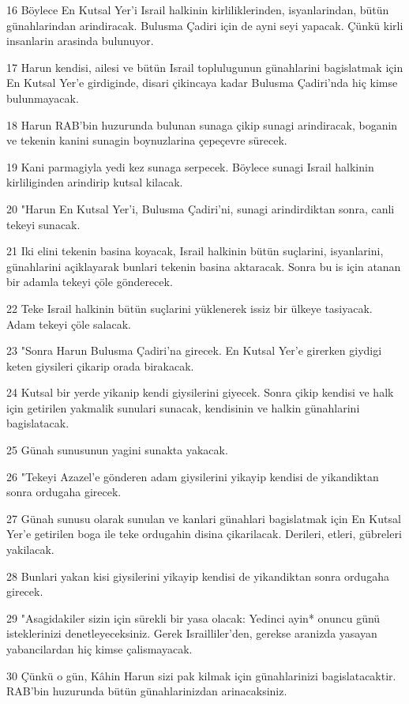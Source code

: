 \par 16 Böylece En Kutsal Yer'i Israil halkinin kirliliklerinden, isyanlarindan, bütün günahlarindan arindiracak. Bulusma Çadiri için de ayni seyi yapacak. Çünkü kirli insanlarin arasinda bulunuyor.
\par 17 Harun kendisi, ailesi ve bütün Israil toplulugunun günahlarini bagislatmak için En Kutsal Yer'e girdiginde, disari çikincaya kadar Bulusma Çadiri'nda hiç kimse bulunmayacak.
\par 18 Harun RAB'bin huzurunda bulunan sunaga çikip sunagi arindiracak, boganin ve tekenin kanini sunagin boynuzlarina çepeçevre sürecek.
\par 19 Kani parmagiyla yedi kez sunaga serpecek. Böylece sunagi Israil halkinin kirliliginden arindirip kutsal kilacak.
\par 20 "Harun En Kutsal Yer'i, Bulusma Çadiri'ni, sunagi arindirdiktan sonra, canli tekeyi sunacak.
\par 21 Iki elini tekenin basina koyacak, Israil halkinin bütün suçlarini, isyanlarini, günahlarini açiklayarak bunlari tekenin basina aktaracak. Sonra bu is için atanan bir adamla tekeyi çöle gönderecek.
\par 22 Teke Israil halkinin bütün suçlarini yüklenerek issiz bir ülkeye tasiyacak. Adam tekeyi çöle salacak.
\par 23 "Sonra Harun Bulusma Çadiri'na girecek. En Kutsal Yer'e girerken giydigi keten giysileri çikarip orada birakacak.
\par 24 Kutsal bir yerde yikanip kendi giysilerini giyecek. Sonra çikip kendisi ve halk için getirilen yakmalik sunulari sunacak, kendisinin ve halkin günahlarini bagislatacak.
\par 25 Günah sunusunun yagini sunakta yakacak.
\par 26 "Tekeyi Azazel'e gönderen adam giysilerini yikayip kendisi de yikandiktan sonra ordugaha girecek.
\par 27 Günah sunusu olarak sunulan ve kanlari günahlari bagislatmak için En Kutsal Yer'e getirilen boga ile teke ordugahin disina çikarilacak. Derileri, etleri, gübreleri yakilacak.
\par 28 Bunlari yakan kisi giysilerini yikayip kendisi de yikandiktan sonra ordugaha girecek.
\par 29 "Asagidakiler sizin için sürekli bir yasa olacak: Yedinci ayin* onuncu günü isteklerinizi denetleyeceksiniz. Gerek Israilliler'den, gerekse aranizda yasayan yabancilardan hiç kimse çalismayacak.
\par 30 Çünkü o gün, Kâhin Harun sizi pak kilmak için günahlarinizi bagislatacaktir. RAB'bin huzurunda bütün günahlarinizdan arinacaksiniz.

